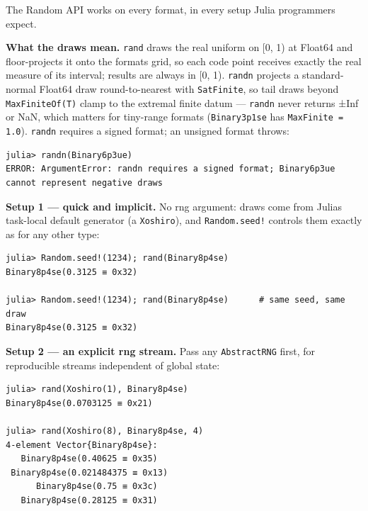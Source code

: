 \label{13027969696381432085}{}


The Random API works on every format, in every setup Julia programmers expect.



\textbf{What the draws mean.} \texttt{rand} draws the real uniform on [0, 1) at Float64 and floor-projects it onto the format{\textquotesingle}s grid, so each code point receives exactly the real measure of its interval; results are always in [0, 1). \texttt{randn} projects a standard-normal Float64 draw round-to-nearest with \texttt{SatFinite}, so tail draws beyond \texttt{MaxFiniteOf(T)} clamp to the extremal finite datum — \texttt{randn} never returns ±Inf or NaN, which matters for tiny-range formats (\texttt{Binary3p1se} has \texttt{MaxFinite = 1.0}). \texttt{randn} requires a signed format; an unsigned format throws:




\begin{verbatim}
julia> randn(Binary6p3ue)
ERROR: ArgumentError: randn requires a signed format; Binary6p3ue cannot represent negative draws
\end{verbatim}



\textbf{Setup 1 — quick and implicit.} No rng argument: draws come from Julia{\textquotesingle}s task-local default generator (a \texttt{Xoshiro}), and \texttt{Random.seed!} controls them exactly as for any other type:




\begin{verbatim}
julia> Random.seed!(1234); rand(Binary8p4se)
Binary8p4se(0.3125 ≡ 0x32)

julia> Random.seed!(1234); rand(Binary8p4se)      # same seed, same draw
Binary8p4se(0.3125 ≡ 0x32)
\end{verbatim}



\textbf{Setup 2 — an explicit rng stream.} Pass any \texttt{AbstractRNG} first, for reproducible streams independent of global state:




\begin{verbatim}
julia> rand(Xoshiro(1), Binary8p4se)
Binary8p4se(0.0703125 ≡ 0x21)

julia> rand(Xoshiro(8), Binary8p4se, 4)
4-element Vector{Binary8p4se}:
   Binary8p4se(0.40625 ≡ 0x35)
 Binary8p4se(0.021484375 ≡ 0x13)
      Binary8p4se(0.75 ≡ 0x3c)
   Binary8p4se(0.28125 ≡ 0x31)
\end{verbatim}



